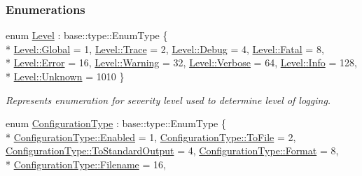 \subsubsection*{Enumerations}
\begin{DoxyCompactItemize}
\item 
enum \hyperlink{a00183_ab0ac6091262344c52dd2d3ad099e8e36}{Level} \+: base\+::type\+::\+Enum\+Type \{ \\*
\hyperlink{a00183_ab0ac6091262344c52dd2d3ad099e8e36a4cc6684df7b4a92b1dec6fce3264fac8}{Level\+::\+Global} = 1, 
\hyperlink{a00183_ab0ac6091262344c52dd2d3ad099e8e36add4ec0ac4e58f7c32a01244ae91150b1}{Level\+::\+Trace} = 2, 
\hyperlink{a00183_ab0ac6091262344c52dd2d3ad099e8e36aa603905470e2a5b8c13e96b579ef0dba}{Level\+::\+Debug} = 4, 
\hyperlink{a00183_ab0ac6091262344c52dd2d3ad099e8e36a882384ec38ce8d9582b57e70861730e4}{Level\+::\+Fatal} = 8, 
\\*
\hyperlink{a00183_ab0ac6091262344c52dd2d3ad099e8e36a902b0d55fddef6f8d651fe1035b7d4bd}{Level\+::\+Error} = 16, 
\hyperlink{a00183_ab0ac6091262344c52dd2d3ad099e8e36a0eaadb4fcb48a0a0ed7bc9868be9fbaa}{Level\+::\+Warning} = 32, 
\hyperlink{a00183_ab0ac6091262344c52dd2d3ad099e8e36ad4a9fa383ab700c5bdd6f31cf7df0faf}{Level\+::\+Verbose} = 64, 
\hyperlink{a00183_ab0ac6091262344c52dd2d3ad099e8e36a4059b0251f66a18cb56f544728796875}{Level\+::\+Info} = 128, 
\\*
\hyperlink{a00183_ab0ac6091262344c52dd2d3ad099e8e36a88183b946cc5f0e8c96b2e66e1c74a7e}{Level\+::\+Unknown} = 1010
 \}
\begin{DoxyCompactList}\small\item\em Represents enumeration for severity level used to determine level of logging. \end{DoxyCompactList}\item 
enum \hyperlink{a00183_a281f5db6d6163678bc68a8b23b59e124}{Configuration\+Type} \+: base\+::type\+::\+Enum\+Type \{ \\*
\hyperlink{a00183_a281f5db6d6163678bc68a8b23b59e124a00d23a76e43b46dae9ec7aa9dcbebb32}{Configuration\+Type\+::\+Enabled} = 1, 
\hyperlink{a00183_a281f5db6d6163678bc68a8b23b59e124acb76297988b895ca263f62728b32dbcc}{Configuration\+Type\+::\+To\+File} = 2, 
\hyperlink{a00183_a281f5db6d6163678bc68a8b23b59e124a9b9a9244b0b26da988f9af8310ab899d}{Configuration\+Type\+::\+To\+Standard\+Output} = 4, 
\hyperlink{a00183_a281f5db6d6163678bc68a8b23b59e124a520d0db389f362bf79ef56ca0af3dcab}{Configuration\+Type\+::\+Format} = 8, 
\\*
\hyperlink{a00183_a281f5db6d6163678bc68a8b23b59e124a1351017ac6423911223bc19a8cb7c653}{Configuration\+Type\+::\+Filename} = 16, 

\end{DoxyCompactItemize}
